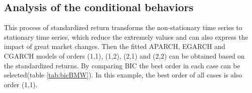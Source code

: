 

\subsection{Analysis of the conditional behaviors}

This process of standardized return transforms the non-stationary time series to stationary time series, which reduce the extremely values and can also express the impact of great market changes. Then the fitted APARCH, EGARCH and CGARCH models of orders (1,1), (1,2), (2,1) and (2,2) can be obtained based on the standardized returns. By comparing BIC the best order in each case can be selected(table \ref{tab:bicBMW}). In this example, the best order of all cases is also order (1,1).








